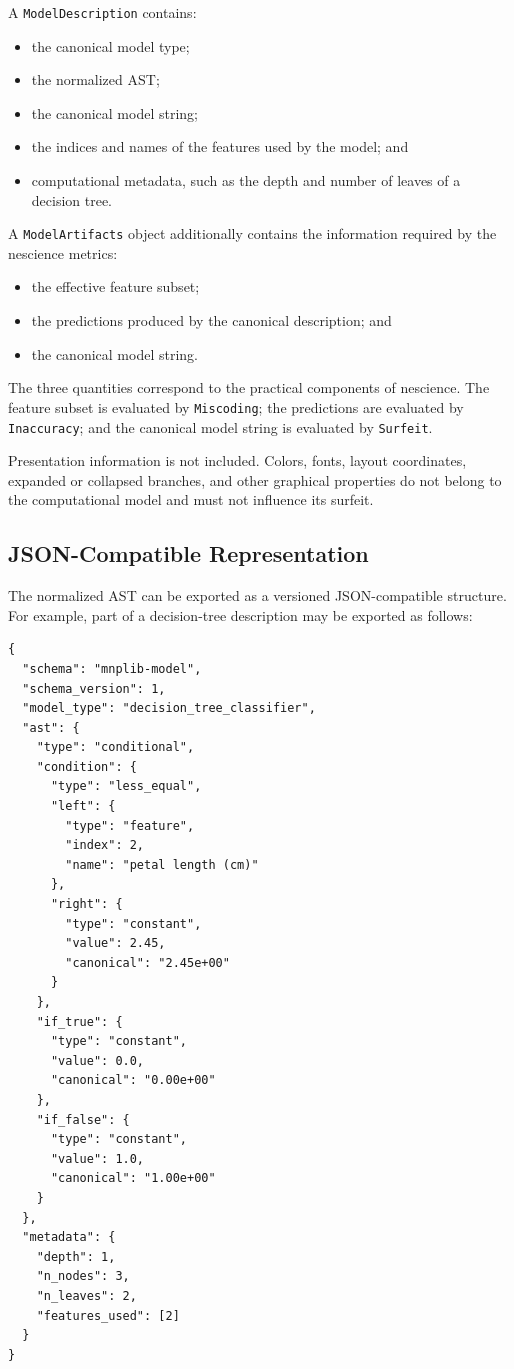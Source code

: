 A \texttt{ModelDescription} contains:

\begin{itemize}
    \item the canonical model type;
    \item the normalized AST;
    \item the canonical model string;
    \item the indices and names of the features used by the model; and
    \item computational metadata, such as the depth and number of leaves of a
          decision tree.
\end{itemize}

A \texttt{ModelArtifacts} object additionally contains the information required
by the nescience metrics:

\begin{itemize}
    \item the effective feature subset;
    \item the predictions produced by the canonical description; and
    \item the canonical model string.
\end{itemize}

The three quantities correspond to the practical components of nescience.
The feature subset is evaluated by \texttt{Miscoding}; the predictions are
evaluated by \texttt{Inaccuracy}; and the canonical model string is evaluated
by \texttt{Surfeit}.

Presentation information is not included. Colors, fonts, layout coordinates,
expanded or collapsed branches, and other graphical properties do not belong
to the computational model and must not influence its surfeit.

\subsection{JSON-Compatible Representation}


The normalized AST can be exported as a versioned JSON-compatible structure.
For example, part of a decision-tree description may be exported as follows:

\begin{verbatim}
{
  "schema": "mnplib-model",
  "schema_version": 1,
  "model_type": "decision_tree_classifier",
  "ast": {
    "type": "conditional",
    "condition": {
      "type": "less_equal",
      "left": {
        "type": "feature",
        "index": 2,
        "name": "petal length (cm)"
      },
      "right": {
        "type": "constant",
        "value": 2.45,
        "canonical": "2.45e+00"
      }
    },
    "if_true": {
      "type": "constant",
      "value": 0.0,
      "canonical": "0.00e+00"
    },
    "if_false": {
      "type": "constant",
      "value": 1.0,
      "canonical": "1.00e+00"
    }
  },
  "metadata": {
    "depth": 1,
    "n_nodes": 3,
    "n_leaves": 2,
    "features_used": [2]
  }
}
\end{verbatim}

